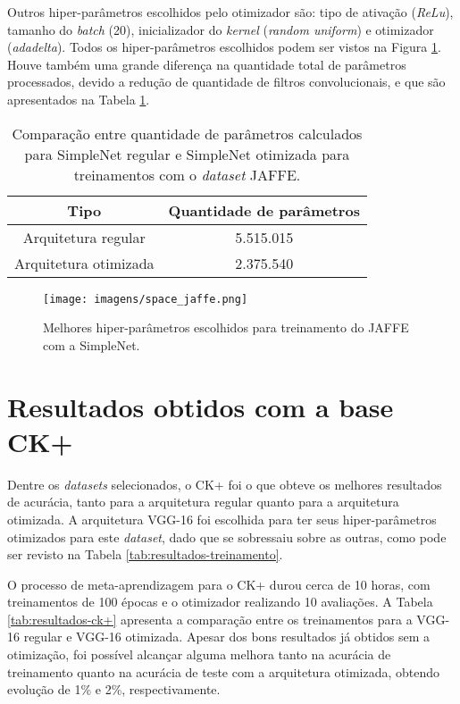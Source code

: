 \documentclass[
12pt,       %
openright,      %
oneside,      %
a4paper,      %
english,      %
french,       %
spanish,      %
brazil        %
]{abntex2}
\begin{document}
Outros hiper-parâmetros escolhidos pelo otimizador são: tipo de ativação (\textit{ReLu}), tamanho do \textit{batch} (20), inicializador do \textit{kernel} (\textit{random uniform}) e otimizador (\textit{adadelta}). Todos os hiper-parâmetros escolhidos podem ser vistos na Figura \ref{fig:space_jaffe}. Houve também uma grande diferença na quantidade total de parâmetros processados, devido a redução de quantidade de filtros convolucionais, e que são apresentados na Tabela \ref{tab:comparacao-parametros-simplenet-jaffe}.

\begin{table}[H]
\centering
\caption{Comparação entre quantidade de parâmetros calculados para SimpleNet regular e SimpleNet otimizada para treinamentos com o \textit{dataset} JAFFE.}
\label{tab:comparacao-parametros-simplenet-jaffe}
\begin{tabular}{@{}cc@{}}
\toprule
\textbf{Tipo}         & \textbf{Quantidade de parâmetros} \\ \midrule
Arquitetura regular   & 5.515.015                         \\
Arquitetura otimizada & 2.375.540                         \\ \bottomrule
\end{tabular}
\end{table}

\begin{figure}[H]
\centering
\caption{Melhores hiper-parâmetros escolhidos para treinamento do JAFFE com a SimpleNet.}
\texttt{[image: imagens/space\_jaffe.png]}
\label{fig:space_jaffe}
\end{figure}



\section{Resultados obtidos com a base CK+} \label{resultados-ck+}

Dentre os \textit{datasets} selecionados, o CK+ foi o que obteve os melhores resultados de acurácia, tanto para a arquitetura regular quanto para a arquitetura otimizada. A arquitetura VGG-16 foi escolhida para ter seus hiper-parâmetros otimizados para este \textit{dataset}, dado que se sobressaiu sobre as outras, como pode ser revisto na Tabela \ref{tab:resultados-treinamento}.

O processo de meta-aprendizagem para o CK+ durou cerca de 10 horas, com treinamentos de 100 épocas e o otimizador realizando 10 avaliações. A Tabela \ref{tab:resultados-ck+} apresenta a comparação entre os treinamentos para a VGG-16 regular e VGG-16 otimizada. Apesar dos bons resultados já obtidos sem a otimização, foi possível alcançar alguma melhora tanto na acurácia de treinamento quanto na acurácia de teste com a arquitetura otimizada, obtendo evolução de 1\% e 2\%, respectivamente.
\end{document}
